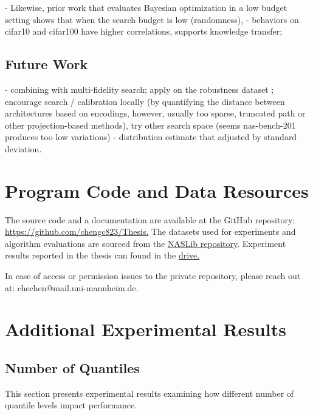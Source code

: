 \documentclass[a4paper,oneside,bibliography=totoc]{scrbook}
\begin{document}
- Likewise, prior work that evaluates Bayesian optimization in a low budget setting shows that when the search budget is low (randomness), 
- behaviors on cifar10 and cifar100 have higher correlations, supports knowledge transfer; 

\section{Future Work}
\label{sec: future_work}
- combining with multi-fidelity search; apply on the robustness dataset ; encourage search / calibration locally (by quantifying the distance between architectures based on encodings, however, usually too sparse, truncated path or other projection-based methods), try other search space (seems nas-bench-201 produces too low variations)
- distribution estimate that adjusted by standard deviation.





\listofalgorithms 
\listoffigures 
\listoftables
\printglossary[type=\acronymtype, title=Acronyms]

\appendix
\chapter{Program Code and Data Resources}
The source code and a documentation are available at the GitHub repository: \url{https://github.com/chengc823/Thesis.}
The datasets used for experiments and algorithm evaluations are sourced from the \href{https://github.com/automl/NASLib/tree/Develop}{NASLib repository}. Experiment results reported in the thesis can found in the \href{https://mega.nz/file/eAd0CR5A#wyrbKvIwBmjKLyFu54-1kNYsa4Z9gg6VSqNzcFrU7lg}{drive.}

In case of access or permission issues to the private repository, please reach out at: chechen@mail.uni-mannheim.de.

\chapter{Additional Experimental Results}
\section{Number of Quantiles}
\label{appendix: s1}
This section presents experimental results examining how different number of quantile levels impact performance.
\end{document}
